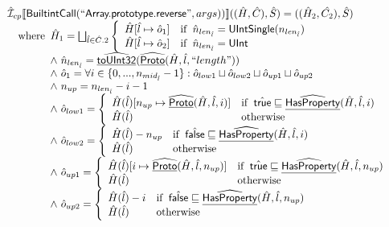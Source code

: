\[\begin{array}{ll}
\hat{\mathcal{I}} _{cp}\llbracket \mbox{\textsf{BuiltintCall}}(``\mbox{\textsf{Array.prototype.reverse}}",args))\rrbracket((\hat{H},\hat{C}), \hat{S})
  = ((\hat{H}_2, \hat{C_2}), \hat{S})\\
\quad{\rm where}\begin{array}[t]{l}
  \hat{H}_1 = \bigsqcup_{\hat{l} \in \hat{C}.2}  \left\{\begin{array}{ll}
      \hat{H}[\hat{l} \mapsto \hat{o}_1] & {\rm if}\begin{array}[t]{l}\hat{n}_{len_{\hat{l}}} = \mbox{\textsf{UIntSingle}}(n_{len_{\hat{l}}})\end{array}\\
      \hat{H}[\hat{l} \mapsto \hat{o}_2] &  {\rm if}\begin{array}[t]{l}\hat{n}_{len_{\hat{l}}} = \mbox{\textsf{UInt}}\end{array}\\
    \end{array}\right.\\
  \land\ \hat{n}_{len_{\hat{l}}} = \widehat{\underline{\sf toUInt32}}(\widehat{\underline{\sf Proto}}(\hat{H}, \hat{l}, ``length"))\\
  \land\ \hat{o}_1 = \forall i \in \{0,..., n_{mid_{\hat{l}}}-1\}: \hat{o}_{low1} \sqcup\hat{o}_{low2} \sqcup\hat{o}_{up1} \sqcup\hat{o}_{up2}\\
  \land\ n_{up} = n_{len_{\hat{l}}} - i - 1\\
  \land\ \hat{o}_{low1} = \left\{\begin{array}{ll}
      \hat{H}(\hat{l})[n_{up} \mapsto \widehat{\underline{\sf Proto}}(\hat{H}, \hat{l}, i)] & {\rm if}\begin{array}[t]{l}\hat{\mbox{\textsf{true}}} \sqsubseteq \widehat{\underline{\sf HasProperty}}(\hat{H}, \hat{l}, i)\end{array}\\
      \hat{H}(\hat{l}) & {\rm otherwise}
    \end{array}\right.\\
  \land\ \hat{o}_{low2} = \left\{\begin{array}{ll}
      \hat{H}(\hat{l})- n_{up} & {\rm if}\begin{array}[t]{l}\hat{\mbox{\textsf{false}}} \sqsubseteq \widehat{\underline{\sf HasProperty}}(\hat{H}, \hat{l}, i)\end{array}\\
      \hat{H}(\hat{l}) & {\rm otherwise}
    \end{array}\right.\\
  \land\ \hat{o}_{up1} = \left\{\begin{array}{ll}
      \hat{H}(\hat{l})[i \mapsto \widehat{\underline{\sf Proto}}(\hat{H}, \hat{l}, n_{up})] & {\rm if}\begin{array}[t]{l}\hat{\mbox{\textsf{true}}} \sqsubseteq \widehat{\underline{\sf HasProperty}}(\hat{H}, \hat{l},  n_{up})\end{array}\\
      \hat{H}(\hat{l}) & {\rm otherwise}
    \end{array}\right.\\
  \land\ \hat{o}_{up2} = \left\{\begin{array}{ll}
      \hat{H}(\hat{l}) - i & {\rm if}\begin{array}[t]{l}\hat{\mbox{\textsf{false}}} \sqsubseteq \widehat{\underline{\sf HasProperty}}(\hat{H}, \hat{l},  n_{up})\end{array}\\
      \hat{H}(\hat{l}) & {\rm otherwise}
    \end{array}\right.\\
\end{array}
\end{array}\]

